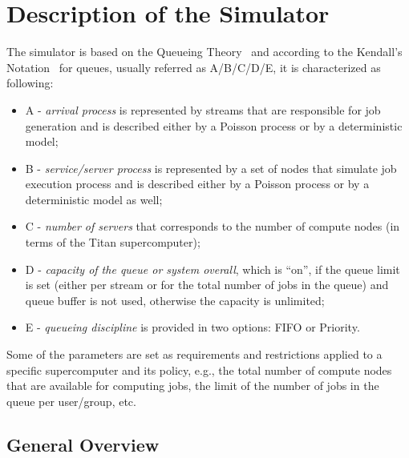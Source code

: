 \section{Description of the Simulator} \label{appendix-simulator-description}

The simulator is based on the Queueing Theory~\cite{ref-queueing-theory} and
according to the Kendall's Notation~\cite{ref-kendall} for queues, usually
referred as A/B/C/D/E, it is characterized as following:
\begin{itemize}
    \item A - \textit{arrival process} is represented by streams that are
    responsible for job generation and is described either by a Poisson
    process or by a deterministic model;
     \item B - \textit{service/server process} is represented by a set of
    nodes that simulate job execution process and is described either by a
    Poisson process or by a deterministic model as well;
    \item C - \textit{number of servers} that corresponds to the number of
    compute nodes (in terms of the Titan supercomputer);
    \item D - \textit{capacity of the queue or system overall}, which is
    ``on'', if the queue limit is set (either per stream or for the total
    number of jobs in the queue) and queue buffer is not used, otherwise the
    capacity is unlimited;
    \item E - \textit{queueing discipline} is provided in two options: FIFO
    or Priority.
\end{itemize}

Some of the parameters are set as requirements and restrictions applied to a
specific supercomputer and its policy, e.g., the total number of compute
nodes that are available for computing jobs, the limit of the number of jobs
in the queue per user/group, etc.

\subsection{General Overview} \label{appendix-simulator-description-1}

